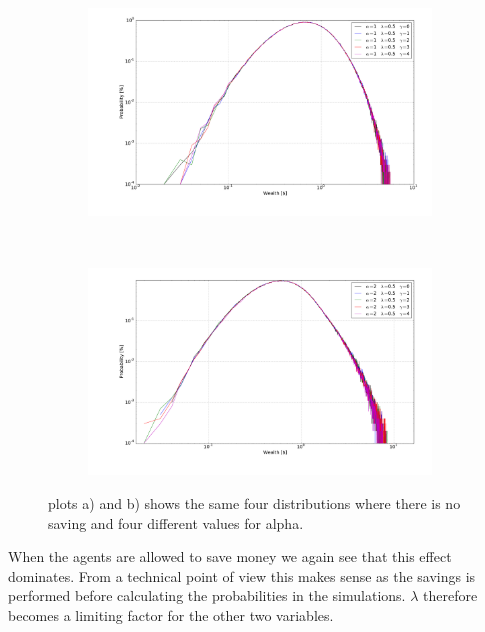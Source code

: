 \begin{figure}[H]
    \centering
    \begin{subfigure}{0.5\textwidth}
        \centering
        \includegraphics[width=\linewidth]{result/5e/5e-1-50-loglog}
        \caption{}
    \end{subfigure}%
    ~ 
    \begin{subfigure}{0.5\textwidth}
        \centering
        \includegraphics[width=\linewidth]{result/5e/5e-2-50-loglog}
        \caption{}
    \end{subfigure}
    \caption{plots a) and b) shows the same four distributions where there is no saving and four different values for alpha.}
    \label{fig:loglog2}
\end{figure}

When the agents are allowed to save money we again see that this effect dominates. From a technical point of view this makes sense as the savings is performed before calculating the probabilities in the simulations. $\lambda$ therefore becomes a limiting factor for the other two variables.
